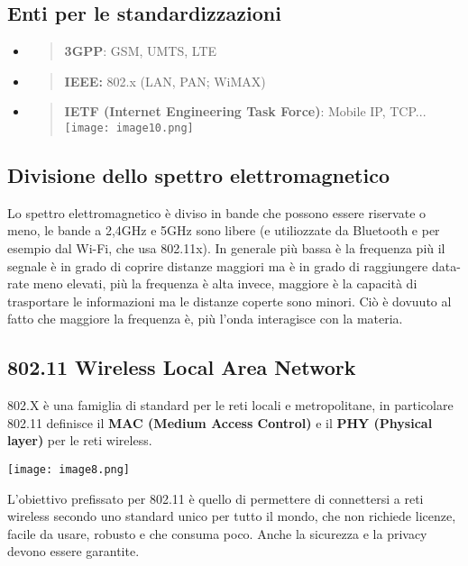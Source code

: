 \subsection{Enti per le
standardizzazioni}\label{enti-per-le-standardizzazioni}

\begin{itemize}
\item
  \begin{quote}
  \textbf{3GPP}: GSM, UMTS, LTE
  \end{quote}
\item
  \begin{quote}
  \textbf{IEEE:} 802.x (LAN, PAN; WiMAX)
  \end{quote}
\item
  \begin{quote}
  \textbf{IETF (Internet Engineering Task Force)}: Mobile IP,
  TCP...\texttt{[image: image10.png]}
  \end{quote}
\end{itemize}

\subsection{Divisione dello spettro elettromagnetico}
Lo spettro elettromagnetico è diviso in bande che possono essere riservate o 
meno, le bande a 2,4GHz e 5GHz sono libere (e utiliozzate da Bluetooth e per 
esempio dal Wi-Fi, che usa 802.11x). In generale più bassa è la frequenza più il 
segnale è in grado di coprire distanze maggiori ma è in grado di raggiungere 
data-rate meno elevati, più la frequenza è alta invece, maggiore è la capacità 
di trasportare le informazioni ma le distanze coperte sono minori. Ciò è dovuuto 
al fatto che maggiore la frequenza è, più l'onda interagisce con la materia.

\subsection{802.11 Wireless Local Area
Network}\label{wireless-local-area-network}

802.X è una famiglia di standard per le reti locali e metropolitane, in
particolare 802.11 definisce il \textbf{MAC (Medium Access Control)} e
il \textbf{PHY (Physical layer)} per le reti wireless.

\texttt{[image: image8.png]}

L'obiettivo prefissato per 802.11 è quello di permettere di connettersi
a reti wireless secondo uno standard unico per tutto il mondo, che non
richiede licenze, facile da usare, robusto e che consuma poco. Anche la sicurezza
e la privacy devono essere garantite.

